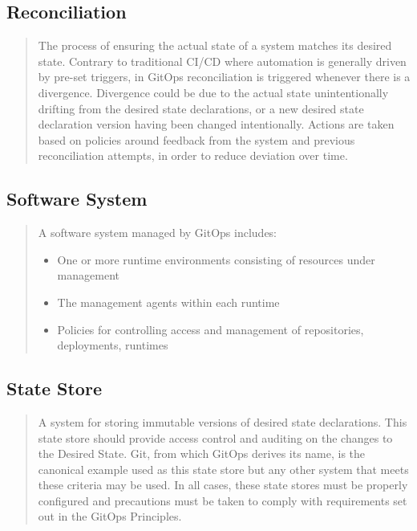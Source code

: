 \subsection*{Reconciliation}
\begin{quotation}
\noindent
The process of ensuring the actual state of a system matches its desired state. Contrary to traditional CI/CD where automation is generally driven by pre-set triggers, in GitOps reconciliation is triggered whenever there is a divergence. Divergence could be due to the actual state unintentionally drifting from the desired state declarations, or a new desired state declaration version having been changed intentionally. Actions are taken based on policies around feedback from the system and previous reconciliation attempts, in order to reduce deviation over time.
\autocite{gitopsGlossary}
\end{quotation}

\subsection*{Software System}
\begin{quotation}
\noindent
A software system managed by GitOps includes:
\begin{itemize}
	\item One or more runtime environments consisting of resources under management
	\item The management agents within each runtime
	\item Policies for controlling access and management of repositories, deployments, runtimes
\end{itemize}
\autocite{gitopsGlossary}
\end{quotation}

\subsection*{State Store}
\begin{quotation}
\noindent
A system for storing immutable versions of desired state declarations. This state store should provide access control and auditing on the changes to the Desired State. Git, from which GitOps derives its name, is the canonical example used as this state store but any other system that meets these criteria may be used. In all cases, these state stores must be properly configured and precautions must be taken to comply with requirements set out in the GitOps Principles.
\autocite{gitopsGlossary}
\end{quotation}

